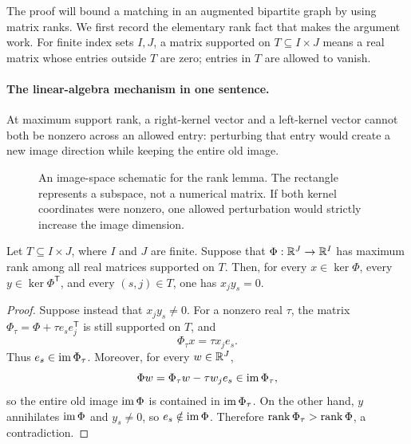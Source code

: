 The proof will bound a matching in an augmented bipartite graph by using
matrix ranks.  We first record the elementary rank fact that makes the
argument work.  For finite index sets $I,J$, a matrix supported on
$T\subseteq I\times J$ means a real matrix whose entries outside $T$ are
zero; entries in $T$ are allowed to vanish.


\paragraph{The linear-algebra mechanism in one sentence.}
At maximum support rank, a right-kernel vector and a left-kernel vector
cannot both be nonzero across an allowed entry: perturbing that entry would
create a new image direction while keeping the entire old image.
\begin{figure}[ht]\centering
\caption{An image-space schematic for the rank lemma. The rectangle represents a subspace, not a numerical matrix. If both kernel coordinates were nonzero, one allowed perturbation would strictly increase the image dimension.}
\end{figure}

\begin{lemma}\label{lem:kernel-support}
Let $T\subseteq I\times J$, where $I$ and $J$ are finite.  Suppose that
$\Phi:\mathbb R^J\to\mathbb R^I$ has maximum rank among all real matrices supported on $T$.
Then, for every $x\in\ker \Phi$, every $y\in\ker \Phi^{\mathsf T}$, and every
$(s,j)\in T$, one has $x_jy_s=0$.
\end{lemma}

\begin{proof}
Suppose instead that $x_jy_s\ne0$.  For a nonzero real $\tau$, the matrix
$\Phi_\tau=\Phi+\tau e_s e_j^{\mathsf T}$ is still supported on $T$, and
\[
 \Phi_\tau x=\tau x_j e_s.
\]
Thus $e_s\in\operatorname{im} \Phi_\tau$.  Moreover, for every $w\in\mathbb R^J$,
\[
 \Phi w=\Phi_\tau w-\tau w_j e_s\in\operatorname{im} \Phi_\tau,
\]
so the entire old image $\operatorname{im} \Phi$ is contained in $\operatorname{im} \Phi_\tau$.
On the other hand, $y$ annihilates $\operatorname{im} \Phi$ and $y_s\ne0$, so
$e_s\notin\operatorname{im} \Phi$.  Therefore $\operatorname{rank} \Phi_\tau>\operatorname{rank} \Phi$, a contradiction.
\end{proof}


